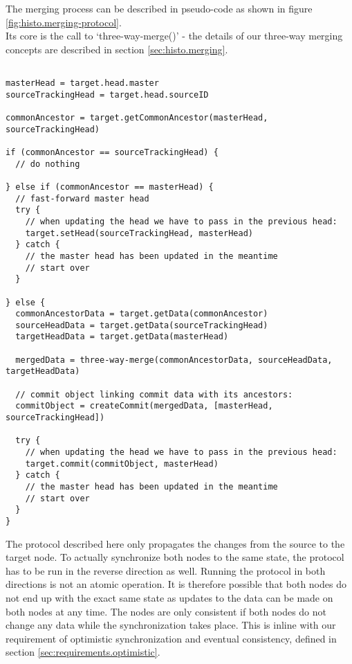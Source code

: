 The merging process can be described in pseudo-code as shown in figure \ref{fig:histo.merging-protocol}.\\
Its core is the call to `three-way-merge()' - the details of our three-way merging concepts are described in section \ref{sec:histo.merging}.\\

\begin{lstlisting}[caption=Merging Protocol, label=fig:histo.merging-protocol]

masterHead = target.head.master
sourceTrackingHead = target.head.sourceID

commonAncestor = target.getCommonAncestor(masterHead, sourceTrackingHead)

if (commonAncestor == sourceTrackingHead) {
  // do nothing

} else if (commonAncestor == masterHead) {
  // fast-forward master head
  try {
    // when updating the head we have to pass in the previous head:
    target.setHead(sourceTrackingHead, masterHead)
  } catch {
    // the master head has been updated in the meantime
    // start over
  }

} else {
  commonAncestorData = target.getData(commonAncestor)
  sourceHeadData = target.getData(sourceTrackingHead)
  targetHeadData = target.getData(masterHead)

  mergedData = three-way-merge(commonAncestorData, sourceHeadData, targetHeadData)

  // commit object linking commit data with its ancestors:
  commitObject = createCommit(mergedData, [masterHead, sourceTrackingHead])

  try {
    // when updating the head we have to pass in the previous head:
    target.commit(commitObject, masterHead)    
  } catch {
    // the master head has been updated in the meantime
    // start over
  }
}

\end{lstlisting}

The protocol described here only propagates the changes from the source to the target node.
To actually synchronize both nodes to the same state, the protocol has to be run in the reverse direction as well.
Running the protocol in both directions is not an atomic operation.
It is therefore possible that both nodes do not end up with the exact same state as updates to the data can be made on both nodes at any time.
The nodes are only consistent if both nodes do not change any data while the synchronization takes place.
This is inline with our requirement of optimistic synchronization and eventual consistency, defined in section \ref{sec:requirements.optimistic}.

